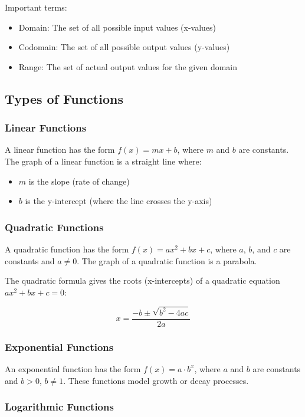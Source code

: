 \documentclass[12pt,a4paper]{article}
\begin{document}
Important terms:
\begin{itemize}
    \item Domain: The set of all possible input values (x-values)
    \item Codomain: The set of all possible output values (y-values)
    \item Range: The set of actual output values for the given domain
\end{itemize}

\subsection{Types of Functions}

\subsubsection{Linear Functions}

A linear function has the form $f(x) = mx + b$, where $m$ and $b$ are constants. The graph of a linear function is a straight line where:
\begin{itemize}
    \item $m$ is the slope (rate of change)
    \item $b$ is the y-intercept (where the line crosses the y-axis)
\end{itemize}

\subsubsection{Quadratic Functions}

A quadratic function has the form $f(x) = ax^2 + bx + c$, where $a$, $b$, and $c$ are constants and $a \neq 0$. The graph of a quadratic function is a parabola.

The quadratic formula gives the roots (x-intercepts) of a quadratic equation $ax^2 + bx + c = 0$:

\[ x = \frac{-b \pm \sqrt{b^2 - 4ac}}{2a} \]

\subsubsection{Exponential Functions}

An exponential function has the form $f(x) = a \cdot b^x$, where $a$ and $b$ are constants and $b > 0$, $b \neq 1$. These functions model growth or decay processes.

\subsubsection{Logarithmic Functions}
\end{document}
